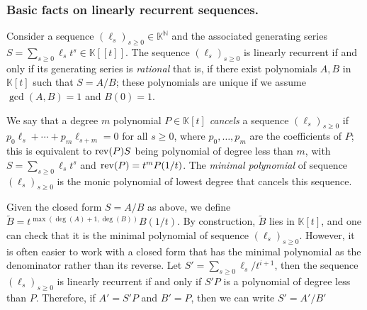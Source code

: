 \documentclass[12pt]{article}
\def\N {\ensuremath{\mathbb{N}}}
\def\K {\ensuremath{\mathbb{K}}}
\def\K{\mathbb{K}}
\begin{document}
\subsubsection{Basic facts on linearly recurrent sequences.} Consider a sequence $(\ell_s)_{s \ge 0} \in \K^\N$
and the associated generating series $S=\sum_{s \ge 0} \ell_s t^s \in
\K[[t]]$. The sequence $(\ell_s)_{s \ge 0}$ is {\rm linearly recurrent} if and
only if its generating series is {\em rational} that is, if there
exist polynomials $A,B$ in $\K[t]$ such that $S=A/B$; these
polynomials are unique if we assume $\gcd(A,B)=1$ and $B(0)=1$. 

We say that a degree $m$ polynomial $P\in\K[t]$ {\em cancels} a
sequence $(\ell_s)_{s \ge 0}$ if $p_0 \ell_s + \cdots + p_m
\ell_{s+m}=0$ for all $s \ge 0$, where $p_0,\dots,p_m$ are the
coefficients of $P$; this is equivalent to ${\rm rev}(P) S$ being
polynomial of degree less than $m$, with $S=\sum_{s \ge 0} \ell_s t^s$
and ${\rm rev}(P)=t^m P(1/t)$. The {\em minimal polynomial} of
sequence $(\ell_s)_{s \ge 0}$ is the monic polynomial of lowest degree
that cancels this sequence. 

Given the closed form $S =  A/B$ as above, we define $\tilde B =
t^{\max(\deg(A)+1,\deg(B))}B(1/t)$.  By construction, $\tilde B$ lies
in $\K[t]$, and one can check that it is the minimal polynomial of
sequence $(\ell_s)_{s \ge 0}$. However, it is often easier to work with a 
closed form that has the minimal polynomial as the denominator rather than
its reverse. Let $S' = \sum_{s\ge0} \ell_s / t^{i+1}$, then the sequence 
$(\ell_s)_{s\ge0}$ is linearly recurrent if and only if $S'P$ is a polynomial
of degree less than $P$. Therefore, if $A' = S'P$ and $B' = P$, then we
can write $S' = A'/B'$
\end{document}
